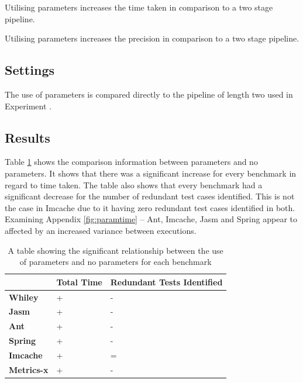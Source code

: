 \begin{hyp}
Utilising parameters increases the time taken in comparison to a two stage pipeline.
\end{hyp}

\begin{hyp}
Utilising parameters increases the precision in comparison to a two stage pipeline.
\end{hyp}

\subsection{Settings}
The use of parameters is compared directly to the pipeline of length two used in Experiment .

\subsection{Results}
 Table \ref{parametersig} shows the comparison information between parameters and no parameters. It shows that there was a significant increase for every benchmark in regard to time taken. The table also shows that every benchmark had a significant decrease for the number of redundant test cases identified. This is not the case in Imcache due to it having zero redundant test cases identified in both. Examining Appendix \ref{fig:paramtime} -- Ant, Imcache, Jasm and Spring appear to affected by an increased variance between executions.
 
\begin{table}[h]
\centering
\begin{tabular}{|l|l|l|}
\hline
{\bf }          & {\bf Total Time} & {\bf Redundant Tests Identified} \\ \hline
{\bf Whiley}    & +                & -                           \\ \hline
{\bf Jasm}      & +               & -                          \\ \hline
{\bf Ant}       & +                & -                           \\ \hline
{\bf Spring}    & +                & -                           \\ \hline
{\bf Imcache}   & +                & =                           \\ \hline
{\bf Metrics-x} & +                & -                           \\ \hline
\end{tabular}
\caption{A table showing the significant relationship between the use of parameters and no parameters for each benchmark}
\label{parametersig}
\end{table}

